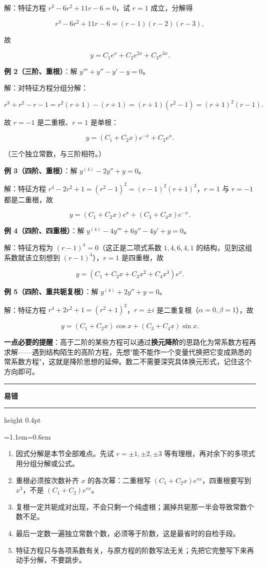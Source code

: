 \documentclass[11pt,openany,UTF8]{ctexbook}
\newcommand{\callouthead}[2]{%
  \par\addvspace{7pt}\noindent
  {\color{#1}\rule[-0.15em]{3pt}{1.05em}}\hspace{0.5em}%
  {\bfseries\color{#1}#2}\par\nobreak\vspace{-0.35em}%
  {\color{rulesep}\hrule height 0.4pt}\nobreak\vspace{0.45em}%
  \begingroup\small\setlength{\parindent}{0pt}%
  \leftskip=1.1em\rightskip=0.6em\noindent\ignorespaces}
\newcommand{\calloutend}{\par\endgroup\addvspace{7pt}}
\newenvironment{callwarn}[1]{\callouthead{warnbar}{#1}}{\calloutend}
\begin{document}
解：特征方程 $r^{3}-6r^{2}+11r-6=0$，试 $r=1$ 成立，分解得

\[r^{3}-6r^{2}+11r-6=(r-1)(r-2)(r-3),\]

故

\[y=C_1e^{x}+C_2e^{2x}+C_3e^{3x}.\]

\textbf{例 2（三阶、重根）}：解 $y'''+y''-y'-y=0$。

解：对特征方程分组分解：

\[r^{3}+r^{2}-r-1=r^{2}(r+1)-(r+1)=(r+1)\left(r^{2}-1\right)=(r+1)^{2}(r-1).\]

故 $r=-1$ 是二重根、$r=1$ 是单根：

\[y=(C_1+C_2x)e^{-x}+C_3e^{x}.\]

（三个独立常数，与三阶相符。）

\textbf{例 3（四阶、重根）}：解 $y^{(4)}-2y''+y=0$。

解：特征方程 $r^{4}-2r^{2}+1=(r^{2}-1)^{2}=(r-1)^{2}(r+1)^{2}$，$r=1$ 与 $r=-1$ 都是二重根，故

\[y=(C_1+C_2x)e^{x}+(C_3+C_4x)e^{-x}.\]

\textbf{例 4（四阶、四重根）}：解 $y^{(4)}-4y'''+6y''-4y'+y=0$。

解：特征方程为 $(r-1)^{4}=0$（这正是二项式系数 $1,4,6,4,1$ 的结构，见到这组系数就该立刻想到 $(r-1)^{4}$），$r=1$ 是四重根，故

\[y=\left(C_1+C_2x+C_3x^{2}+C_4x^{3}\right)e^{x}.\]

\textbf{例 5（四阶、重共轭复根）}：解 $y^{(4)}+2y''+y=0$。

解：特征方程 $r^{4}+2r^{2}+1=(r^{2}+1)^{2}$，$r=\pm i$ 是二重复根（$\alpha=0,\beta=1$），故

\[y=(C_1+C_2x)\cos x+(C_3+C_4x)\sin x .\]

\textbf{一点必要的提醒}：高于二阶的某些方程可以通过\textbf{换元降阶}的思路化为常系数方程再求解——遇到结构陌生的高阶方程，先想"能不能作一个变量代换把它变成熟悉的常系数方程"，这就是降阶思想的延伸。数二不需要深究具体换元形式，记住这个方向即可。

\begin{callwarn}{易错}
\begin{enumerate}
\item 因式分解是本节全部难点。先试 $r=\pm1,\pm2,\pm3$ 等有理根，再对余下的多项式用分组分解或公式。
\item 重根必须按次数补齐 $x$ 的各次幂：二重根写 $(C_1+C_2x)e^{rx}$，四重根要写到 $x^{3}$，不是 $(C_1+C_2)e^{rx}$。
\item 复根一定共轭成对出现，不会只剩一个纯虚根；漏掉共轭那一半会导致常数个数不足。
\item 最后一定数一遍独立常数个数，必须等于阶数，这是最省时的自检手段。
\item 特征方程只与各项系数有关，与原方程的阶数写法无关；先把它完整写下来再动手分解，不要跳步。
\end{enumerate}
\end{callwarn}
\end{document}
